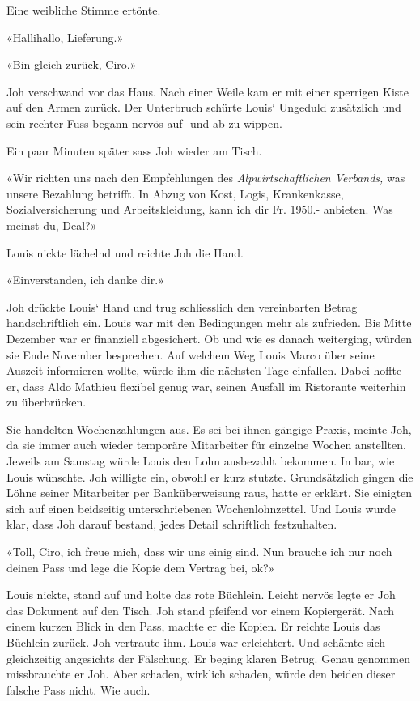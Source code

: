 Eine weibliche Stimme ertönte.

«Hallihallo, Lieferung.»

«Bin gleich zurück, Ciro.»

Joh verschwand vor das Haus. Nach einer Weile kam er mit einer sperrigen
Kiste auf den Armen zurück. Der Unterbruch schürte Louis` Ungeduld
zusätzlich und sein rechter Fuss begann nervös auf- und ab zu wippen.

Ein paar Minuten später sass Joh wieder am Tisch.

«Wir richten uns nach den Empfehlungen des \emph{Alpwirtschaftlichen
Verbands,} was unsere Bezahlung betrifft. In Abzug von Kost, Logis,
Krankenkasse, Sozialversicherung und Arbeitskleidung, kann ich dir Fr.
1950.- anbieten. Was meinst du, Deal?»

Louis nickte lächelnd und reichte Joh die Hand.

«Einverstanden, ich danke dir.»

Joh drückte Louis` Hand und trug schliesslich den vereinbarten Betrag
handschriftlich ein. Louis war mit den Bedingungen mehr als zufrieden.
Bis Mitte Dezember war er finanziell abgesichert. Ob und wie es danach
weiterging, würden sie Ende November besprechen. Auf welchem Weg Louis
Marco über seine Auszeit informieren wollte, würde ihm die nächsten Tage
einfallen. Dabei hoffte er, dass Aldo Mathieu flexibel genug war, seinen
Ausfall im Ristorante weiterhin zu überbrücken.

Sie handelten Wochenzahlungen aus. Es sei bei ihnen gängige Praxis,
meinte Joh, da sie immer auch wieder temporäre Mitarbeiter für einzelne
Wochen anstellten. Jeweils am Samstag würde Louis den Lohn ausbezahlt
bekommen. In bar, wie Louis wünschte. Joh willigte ein, obwohl er kurz
stutzte. Grundsätzlich gingen die Löhne seiner Mitarbeiter per
Banküberweisung raus, hatte er erklärt. Sie einigten sich auf einen
beidseitig unterschriebenen Wochenlohnzettel. Und Louis wurde klar, dass
Joh darauf bestand, jedes Detail schriftlich festzuhalten.

«Toll, Ciro, ich freue mich, dass wir uns einig sind. Nun brauche ich
nur noch deinen Pass und lege die Kopie dem Vertrag bei, ok?»

Louis nickte, stand auf und holte das rote Büchlein. Leicht nervös legte
er Joh das Dokument auf den Tisch. Joh stand pfeifend vor einem
Kopiergerät. Nach einem kurzen Blick in den Pass, machte er die Kopien.
Er reichte Louis das Büchlein zurück. Joh vertraute ihm. Louis war
erleichtert. Und schämte sich gleichzeitig angesichts der Fälschung. Er
beging klaren Betrug. Genau genommen missbrauchte er Joh. Aber schaden,
wirklich schaden, würde den beiden dieser falsche Pass nicht. Wie auch.

